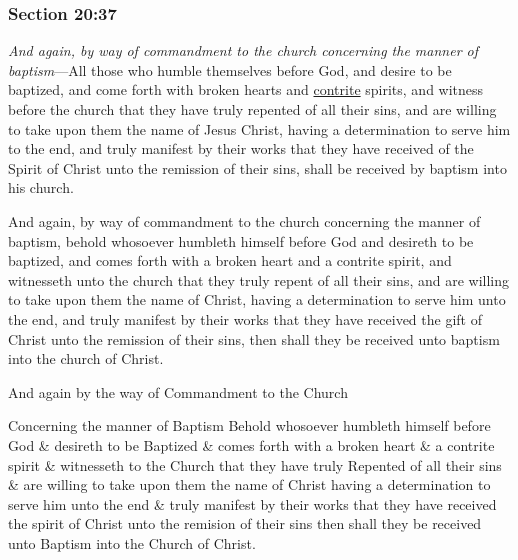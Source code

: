 	\subsubsection{Section 20:37} %
		\label{DC20-37}

		\textit{And again, by way of commandment to the church concerning the manner of baptism}---All those who humble themselves before God, and desire to be baptized, and come forth with broken hearts and \hyperref[CONTRITE]{contrite} spirits, and witness before the church that they have truly repented of all their sins, and are willing to take upon them the name of Jesus Christ, having a determination to serve him to the end, and truly manifest by their works that they have received of the Spirit of Christ unto the remission of their sins, shall be received by baptism into his church.

		\begin{framed}
		\scriptsize
			\begin{compactdesc}
				\item[JSP] And again, by way of commandment to the church concerning the manner of baptism, behold whosoever humbleth himself before God and desireth to be baptized, and comes forth with a broken heart and a contrite spirit, and witnesseth unto the church that they truly repent of all their sins, and are willing to take upon them the name of Christ, having a determination to serve him unto the end, and truly manifest by their works that they have received the gift of Christ unto the remission of their sins, then shall they be received unto baptism into the church of Christ.
				\item[RB1] And again by the way of Commandment to the Church

							Concerning the manner of Baptism Behold whosoever humbleth himself before God \& desireth to be Baptized \& comes forth with a broken heart \& a contrite spirit \& witnesseth to the Church that they have truly Repented of all their sins \& are willing to take upon them the name of Christ having a determination to serve him unto the end \& truly manifest by their works that they have received the spirit of Christ unto the remision of their sins then shall they be received unto Baptism into the Church of Christ.
			\end{compactdesc}
		\end{framed}


